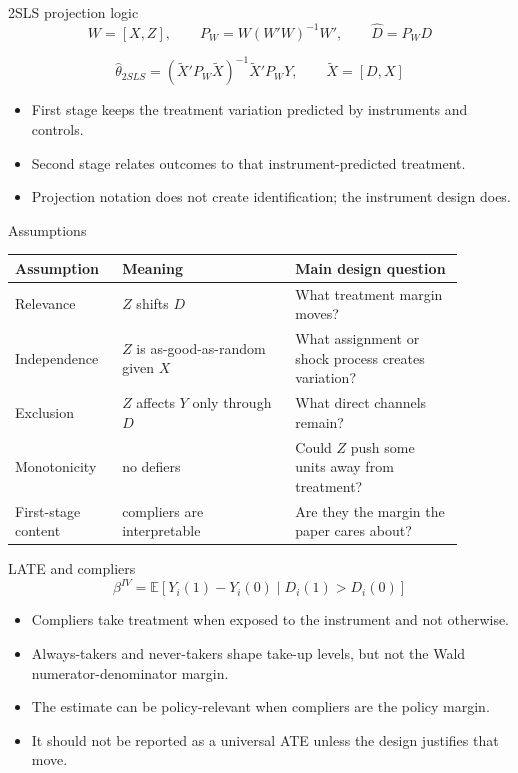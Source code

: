 \documentclass[aspectratio=169,11pt]{beamer}
\newcommand{\E}{\mathbb{E}}
\newcommand{\1}{\mathbf{1}}
\begin{document}
\begin{frame}{2SLS projection logic}
\[
W=[X,Z],
\qquad
P_W=W(W'W)^{-1}W',
\qquad
\widehat{D}=P_WD
\]

\[
\widehat{\theta}_{2SLS}
=
(\widetilde X'P_W\widetilde X)^{-1}\widetilde X'P_WY,
\qquad
\widetilde X=[D,X]
\]

\begin{itemize}
    \item First stage keeps the treatment variation predicted by instruments and controls.
    \item Second stage relates outcomes to that instrument-predicted treatment.
    \item Projection notation does not create identification; the instrument design does.
\end{itemize}
\end{frame}

\begin{frame}{Assumptions}
\small
\begin{tabular}{p{0.20\linewidth} p{0.35\linewidth} p{0.34\linewidth}}
\toprule
Assumption & Meaning & Main design question \\
\midrule
Relevance & $Z$ shifts $D$ & What treatment margin moves? \\
Independence & $Z$ is as-good-as-random given $X$ & What assignment or shock process creates variation? \\
Exclusion & $Z$ affects $Y$ only through $D$ & What direct channels remain? \\
Monotonicity & no defiers & Could $Z$ push some units away from treatment? \\
First-stage content & compliers are interpretable & Are they the margin the paper cares about? \\
\bottomrule
\end{tabular}
\end{frame}

\begin{frame}{LATE and compliers}
\[
\beta^{IV}
=
\E\left[Y_i(1)-Y_i(0)\mid D_i(1)>D_i(0)\right]
\]

\begin{itemize}
    \item Compliers take treatment when exposed to the instrument and not otherwise.
    \item Always-takers and never-takers shape take-up levels, but not the Wald numerator-denominator margin.
    \item The estimate can be policy-relevant when compliers are the policy margin.
    \item It should not be reported as a universal ATE unless the design justifies that move.
\end{itemize}
\end{frame}
\end{document}
